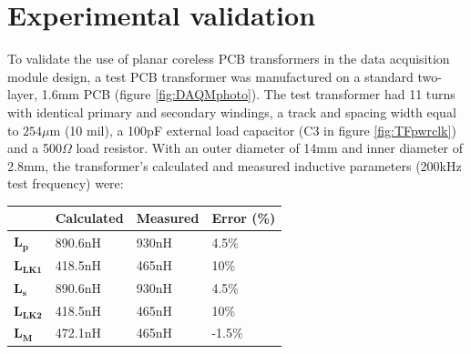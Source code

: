 \documentclass[conference]{IEEEtran}
\begin{document}
\section{Experimental validation}
To validate the use of planar coreless PCB transformers in the data acquisition module design, a test PCB transformer was manufactured on a standard two-layer, 1.6mm PCB (figure \ref{fig:DAQMphoto}).  The test transformer had 11 turns with identical primary and secondary windings, a track and spacing width equal to $ 254\mu $m (10 mil), a 100pF external load capacitor (C3 in figure \ref{fig:TFpwrclk}) and a 500$\Omega$ load resistor.  With an outer diameter of 14mm and inner diameter of 2.8mm, the transformer's calculated and measured inductive parameters (200kHz test frequency) were:

\begin{table}[h]
\begin{tabular}{l|l|l|l|}
\cline{2-4}
              & \textbf{Calculated} & \textbf{Measured} & \textbf{Error (\%)} \\[3pt] \hline 
\multicolumn{1}{|l|}{$\mathbf{L_{p}}$}   & 890.6nH    & 930nH    & 4.5\%      \\[3pt] \hline 
\multicolumn{1}{|l|}{$\mathbf{L_{LK1}}$} & 418.5nH    & 465nH    & 10\%       \\[3pt] \hline 
\multicolumn{1}{|l|}{$\mathbf{L_{s}}$}   & 890.6nH    & 930nH    & 4.5\%      \\[3pt] \hline 
\multicolumn{1}{|l|}{$\mathbf{L_{LK2}}$} & 418.5nH    & 465nH    & 10\%       \\[3pt] \hline 
\multicolumn{1}{|l|}{$\mathbf{L_{M}}$}   & 472.1nH    & 465nH    & -1.5\%     \\[3pt] \hline
\end{tabular}
\end{table}
\end{document}
